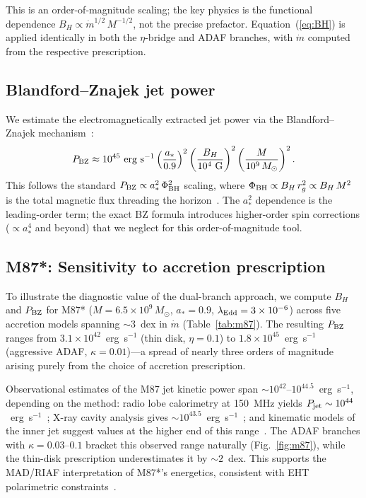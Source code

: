 \documentclass[11pt]{article}
\begin{document}
This is an order-of-magnitude scaling; the key physics is the functional dependence $B_H \propto \dot{m}^{1/2}\,M^{-1/2}$, not the precise prefactor.
Equation~(\ref{eq:BH}) is applied identically in both the $\eta$-bridge and ADAF branches, with $\dot{m}$ computed from the respective prescription.

\subsection{Blandford--Znajek jet power}\label{sec:PBZ}

We estimate the electromagnetically extracted jet power via the Blandford--Znajek mechanism~\cite{BlandfordZnajek1977}:
\begin{equation}
P_{\rm BZ} \approx 10^{45}~\text{erg s}^{-1}\left(\frac{a_*}{0.9}\right)^{2}\left(\frac{B_H}{10^{4}~\text{G}}\right)^{2}\left(\frac{M}{10^{9}\,M_\odot}\right)^{2}.\label{eq:PBZ}
\end{equation}
This follows the standard $P_{\rm BZ}\propto a_*^2\,\Phi_{\rm BH}^2$ scaling, where $\Phi_{\rm BH}\propto B_H\,r_g^2 \propto B_H\,M^2$ is the total magnetic flux threading the horizon~\cite{BlandfordZnajek1977,Tchekhovskoy2010}.
The $a_*^2$ dependence is the leading-order term; the exact BZ formula introduces higher-order spin corrections ($\propto a_*^4$ and beyond) that we neglect for this order-of-magnitude tool.

\subsection{M87*: Sensitivity to accretion prescription}\label{sec:m87_sensitivity}

To illustrate the diagnostic value of the dual-branch approach, we compute $B_H$ and $P_{\rm BZ}$ for M87* ($M=6.5\times 10^9\,M_\odot$, $a_*=0.9$, $\lambda_{\rm Edd}=3\times 10^{-6}$) across five accretion models spanning $\sim 3$~dex in $\dot{m}$ (Table~\ref{tab:m87}).
The resulting $P_{\rm BZ}$ ranges from $3.1\times 10^{42}$~erg~s$^{-1}$ (thin disk, $\eta=0.1$) to $1.8\times 10^{45}$~erg~s$^{-1}$ (aggressive ADAF, $\kappa=0.01$)---a spread of nearly three orders of magnitude arising purely from the choice of accretion prescription.

Observational estimates of the M87 jet kinetic power span $\sim 10^{42}$--$10^{44.5}$~erg~s$^{-1}$, depending on the method: radio lobe calorimetry at 150~MHz yields $P_{\rm jet}\sim 10^{44}$~erg~s$^{-1}$~\cite{deGasperin2012}; X-ray cavity analysis gives $\sim 10^{43.5}$~erg~s$^{-1}$~\cite{Russell2013}; and kinematic models of the inner jet suggest values at the higher end of this range~\cite{EHT2019M87I}.
The ADAF branches with $\kappa=0.03$--$0.1$ bracket this observed range naturally (Fig.~\ref{fig:m87}), while the thin-disk prescription underestimates it by $\sim 2$~dex.
This supports the MAD/RIAF interpretation of M87*'s energetics, consistent with EHT polarimetric constraints~\cite{EHT2021M87Pol}.
\end{document}
